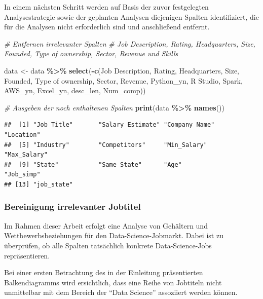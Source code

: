 \documentclass[
]{article}
\newenvironment{Shaded}{\begin{snugshade}}{\end{snugshade}}
\newcommand{\AttributeTok}[1]{\textcolor[rgb]{0.13,0.29,0.53}{#1}}
\newcommand{\CommentTok}[1]{\textcolor[rgb]{0.56,0.35,0.01}{\textit{#1}}}
\newcommand{\FunctionTok}[1]{\textcolor[rgb]{0.13,0.29,0.53}{\textbf{#1}}}
\newcommand{\NormalTok}[1]{#1}
\newcommand{\OtherTok}[1]{\textcolor[rgb]{0.56,0.35,0.01}{#1}}
\newcommand{\SpecialCharTok}[1]{\textcolor[rgb]{0.81,0.36,0.00}{\textbf{#1}}}
\newcommand{\StringTok}[1]{\textcolor[rgb]{0.31,0.60,0.02}{#1}}
\begin{document}
In einem nächsten Schritt werden auf Basis der zuvor festgelegten
Analysestrategie sowie der geplanten Analysen diejenigen Spalten
identifiziert, die für die Analysen nicht erforderlich sind und
anschließend entfernt.

\begin{Shaded}
\begin{Highlighting}[]
\CommentTok{\# Entfernen irrelevanter Spalten}
\CommentTok{\# Job Description, Rating, Headquarters, Size, Founded, Type of ownership, Sector, Revenue und Skills}

\NormalTok{data }\OtherTok{\textless{}{-}}\NormalTok{ data }\SpecialCharTok{\%\textgreater{}\%}
  \FunctionTok{select}\NormalTok{(}\SpecialCharTok{{-}}\FunctionTok{c}\NormalTok{(}\StringTok{\textasciigrave{}}\AttributeTok{Job Description}\StringTok{\textasciigrave{}}\NormalTok{, Rating, Headquarters, Size, Founded,}
            \StringTok{\textasciigrave{}}\AttributeTok{Type of ownership}\StringTok{\textasciigrave{}}\NormalTok{, Sector, Revenue, Python\_yn,}
            \StringTok{\textasciigrave{}}\AttributeTok{R Studio}\StringTok{\textasciigrave{}}\NormalTok{, Spark, AWS\_yn, Excel\_yn, desc\_len, Num\_comp))}

\CommentTok{\# Ausgeben der noch enthaltenen Spalten}
\FunctionTok{print}\NormalTok{(data }\SpecialCharTok{\%\textgreater{}\%} \FunctionTok{names}\NormalTok{())}
\end{Highlighting}
\end{Shaded}

\begin{verbatim}
##  [1] "Job Title"       "Salary Estimate" "Company Name"    "Location"       
##  [5] "Industry"        "Competitors"     "Min_Salary"      "Max_Salary"     
##  [9] "State"           "Same State"      "Age"             "Job_simp"       
## [13] "job_state"
\end{verbatim}

\subsubsection{Bereinigung irrelevanter
Jobtitel}\label{bereinigung-irrelevanter-jobtitel}

Im Rahmen dieser Arbeit erfolgt eine Analyse von Gehältern und
Wettbewerbsbeziehungen für den Data-Science-Jobmarkt. Dabei ist zu
überprüfen, ob alle Spalten tatsächlich konkrete Data-Science-Jobs
repräsentieren.

Bei einer ersten Betrachtung des in der Einleitung präsentierten
Balkendiagramms wird ersichtlich, dass eine Reihe von Jobtiteln nicht
unmittelbar mit dem Bereich der ``Data Science'' assoziiert werden
können.
\end{document}
